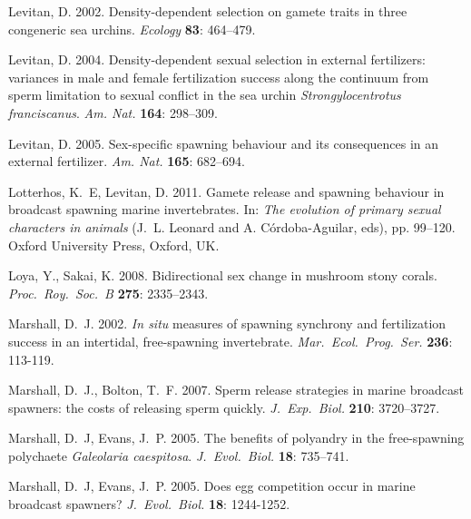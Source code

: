 \documentclass{article}
\begin{document}
\begin{thebibliography}{}
Levitan, D. 2002.
\newblock Density-dependent selection on gamete traits in three congeneric sea urchins.
\newblock \textit{Ecology} \textbf{83}: 464--479.

Levitan, D. 2004.
\newblock Density-dependent sexual selection in external fertilizers: variances in male and female fertilization success along the continuum from sperm limitation to sexual conflict in the sea urchin \textit{Strongylocentrotus franciscanus}.
\newblock \textit{Am. Nat.} \textbf{164}: 298--309.

Levitan, D. 2005.
\newblock Sex-specific spawning behaviour and its consequences in an external fertilizer.
\newblock \textit{Am. Nat.} \textbf{165}: 682--694.

Lotterhos, K.~E, Levitan, D. 2011.
\newblock Gamete release and spawning behaviour in broadcast spawning marine invertebrates.
\newblock In: \textit{The evolution of primary sexual characters in animals} (J.~L. Leonard and A. C\'{o}rdoba-Aguilar, eds), pp. 99--120. Oxford University Press, Oxford, UK.

Loya, Y., Sakai, K. 2008.
\newblock Bidirectional sex change in mushroom stony corals.
\newblock \textit{Proc.~Roy.~Soc.~B} \textbf{275}: 2335--2343.

Marshall, D.~J. 2002.
\newblock \textit{In situ} measures of spawning synchrony and fertilization success in an intertidal, free-spawning invertebrate.
\newblock \textit{Mar.~Ecol.~Prog.~Ser.} \textbf{236}: 113-119.

Marshall, D.~J., Bolton, T.~F. 2007.
\newblock Sperm release strategies in marine broadcast spawners: the costs of releasing sperm quickly.
\newblock \textit{J.~Exp.~Biol.} \textbf{210}: 3720--3727.

Marshall, D.~J, Evans, J.~P. 2005.
\newblock The benefits of polyandry in the free-spawning polychaete \textit{Galeolaria caespitosa}.
\newblock \textit{J.~Evol.~Biol.} \textbf{18}: 735--741.

Marshall, D.~J, Evans, J.~P. 2005.
\newblock Does egg competition occur in marine broadcast spawners? 
\newblock \textit{J.~Evol.~Biol.} \textbf{18}: 1244-1252.


\end{thebibliography}
\end{document}
